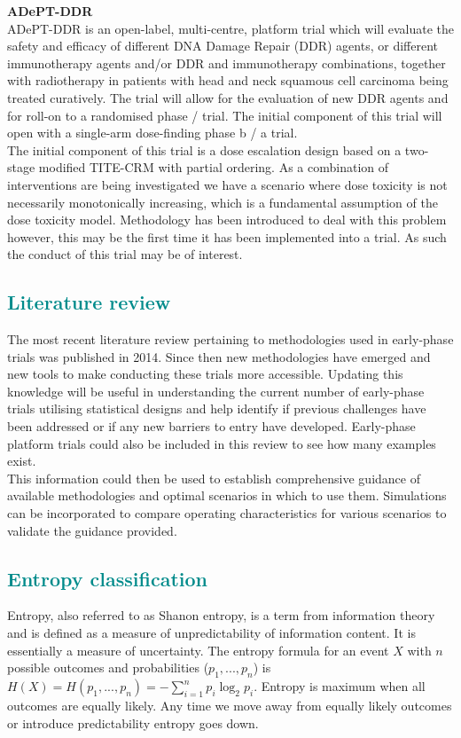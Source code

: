 \documentclass[a4paper, 11pt]{article} %
\newcommand{\RN}[1]{
	\textup{\uppercase\expandafter{\romannumeral#1}}} %
\begin{document}
\noindent \textbf{ADePT-DDR}\\
\noindent ADePT-DDR is an open-label, multi-centre, platform trial which will evaluate the safety and efficacy of different DNA Damage Repair (DDR) agents, or different immunotherapy agents and/or DDR and immunotherapy combinations, together with radiotherapy in patients with head and neck squamous cell carcinoma being treated curatively. The trial will allow for the evaluation of new DDR agents and for roll-on to a randomised phase\RN{2} /\RN{3} trial. The initial component of this trial will open with a single-arm dose-finding phase\RN{1}b /\RN{2}a trial. \\

\noindent The initial component of this trial is a dose escalation design based on a two-stage modified TITE-CRM with partial ordering. As a combination of interventions are being investigated we have a scenario where dose toxicity is not necessarily monotonically increasing, which is a fundamental assumption of the dose toxicity model. Methodology has been introduced to deal with this problem \cite{Wages2013} however, this may be the first time it has been implemented into a trial. As such the conduct of this trial may be of interest. 


\subsection{\textcolor{DarkCyan}{Literature review}} 

The most recent literature review pertaining to methodologies used in early-phase trials was published in 2014. Since then new methodologies have emerged and new tools to make conducting these trials more accessible. Updating this knowledge will be useful in understanding the current number of early-phase trials utilising statistical designs and help identify if previous challenges have been addressed or if any new barriers to entry have developed. Early-phase platform trials could also be included in this review to see how many examples exist. \\ 

\noindent This information could then be used to establish comprehensive guidance of available methodologies and optimal scenarios in which to use them. Simulations can be incorporated to compare operating characteristics for various scenarios to validate the guidance provided.  

\subsection{\textcolor{DarkCyan}{Entropy classification}}
Entropy, also referred to as Shanon entropy, is a term from information theory and is defined as a measure of unpredictability of information content. It is essentially a measure of uncertainty. The entropy formula for an event $X$ with $n$ possible outcomes and probabilities ($p_{1}, ..., p_{n}$) is $H(X)= H(p_{1}, ..., p_{n})=- \sum_{i=1}^{n}p_{i}\log_2p_{i}$. Entropy is maximum when all outcomes are equally likely. Any time we move away from equally likely outcomes or introduce predictability entropy goes down. \\
\end{document}
